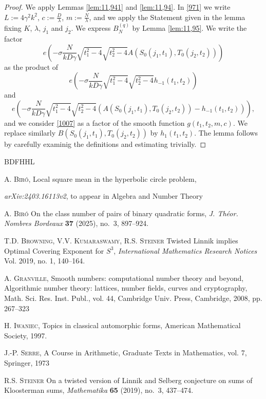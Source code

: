 \documentclass[12pt]{amsart}
\theoremstyle{definition}
\numberwithin{equation}{section}
\begin{document}
\begin{proof}We apply Lemmas \ref{lem:11,941} and
\ref{lem:11,94}. In \eqref{971} we write $L:=4\gamma^2k^2$, $c:=\frac
D{\lambda}$,
$m:=\frac N{\lambda}$, and we apply the Statement given in the lemma
fixing $K$, $\lambda$, $j_1$ and $j_2$. We express $B_N^{(q)}$ by Lemma \ref{lem:11,95}. We write the factor
\[e\left(-\sigma\frac N{kD\gamma}\sqrt {t_1^2-4}\sqrt {t_2^2-4}A\left
(S_0\left(j_1,t_1\right),T_0\left(j_2,t_2\right)\right)\right)\]
as the product of
\[e\left(-\sigma\frac N{kD\gamma}\sqrt {t_1^2-4}\sqrt {t_2^2-4}h_{
-1}\left(t_1,t_2\right)\right)\]
and
\begin{equation}e\left(-\sigma\frac N{kD\gamma}\sqrt {t_1^2-4}\sqrt {
t_2^2-4}\left(A\left(S_0\left(j_1,t_1\right),T_0\left(j_2,t_2\right
)\right)-h_{-1}\left(t_1,t_2\right)\right)\right),\label{1007}\end{equation}
and we consider \eqref{1007} as a factor of the smooth
function $g\left(t_1,t_2,m,c\right)$. We replace similarly
$B\left(S_0\left(j_1,t_1\right),T_0\left(j_2,t_2\right)\right)$ by $
h_1\left(t_1,t_2\right)$. The lemma follows
by carefully examinig the definitions and estimating
trivially.



\end{proof}



\begin{thebibliography}{BDFHHL}




 \textsc{A. Biró}, Local square mean in the hyperbolic circle problem,

\emph{arXiv:2403.16113v2}, to appear in Algebra and Number Theory

 \textsc{A. Biró} On the class number of pairs of binary quadratic forms,
\emph{J. Théor. Nombres Bordeaux} \textbf{37} (2025), no.~3, 897--924.


 \textsc{T.D. Browning, V.V. Kumaraswamy, R.S. Steiner} Twisted Linnik implies Optimal Covering Exponent for $S^3$,
\emph{International Mathematics Research Notices} Vol. 2019, no. 1, 140--164.


 \textsc{A. Granville}, Smooth numbers: computational number theory and beyond, Algorithmic number theory: lattices, number fields, curves and cryptography, Math. Sci. Res. Inst. Publ., vol. 44, Cambridge Univ. Press, Cambridge, 2008, pp. 267–323



 \textsc{H. Iwaniec}, Topics in
classical automorphic forms, American Mathematical Society, 1997.


 \textsc{J.-P. Serre}, A Course in Arithmetic, Graduate Texts in Mathematics, vol. 7, Springer, 1973

 \textsc{R.S. Steiner} On a twisted version of Linnik and Selberg conjecture on sums of Kloosterman sums,
\emph{Mathematika} \textbf{65} (2019), no.~3, 437--474.







\end{thebibliography}
\end{document}
